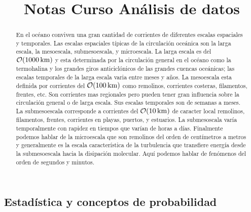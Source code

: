 \documentclass[
]{agujournal2019}
\begin{document}
\title{Notas Curso Análisis de datos}




\begin{abstract}
En el océano conviven una gran cantidad de corrientes de diferentes
escalas espaciales y temporales. Las escalas espaciales típicas de la
circulación oceánica son la larga escala, la mesoescala, submesoescala,
y microescala. La larga escala es del \({\cal O}(1000\,{\rm km})\) y
esta determinada por la circulación general en el océano como la
termohalina y los grandes giros anticiclónicos de las grandes cuencas
oceánicas; las escalas temporales de la larga escala varia entre meses y
años. La mesoescala esta definida por corrientes del
\({\cal O}(100\,{\rm km})\) como remolinos, corrientes costeras,
filamentos, frentes, etc. Son corrientes mas regionales pero pueden
tener gran influencia sobre la circulación general o de larga escala.
Sus escalas temporales son de semanas a meses. La submesoescala
corresponde a corrientes del \({\cal O}(10\,{\rm km})\) de caracter
local remolinos, filamentos, frentes, corrientes en playas, puertos, y
estuarios. La submesoscala varía temporalmente con rapidez en tiempos
que varían de horas a días. Finalmente podemos hablar de la microescala
que son remolinos del orden de centímetros a metros y generalmente es la
escala característica de la turbulencia que transfiere energía desde la
submesoescala hacia la disipación molecular. Aquí podemos hablar de
fenómenos del orden de segundos y minutos.
\end{abstract}



\ifdefined\Shaded\renewenvironment{Shaded}{\begin{tcolorbox}[interior hidden, borderline west={3pt}{0pt}{shadecolor}, enhanced, frame hidden, boxrule=0pt, sharp corners, breakable]}{\end{tcolorbox}}\fi



\hypertarget{estaduxedstica-y-conceptos-de-probabilidad}{%
\subsection{Estadística y conceptos de
probabilidad}\label{estaduxedstica-y-conceptos-de-probabilidad}}
\end{document}
